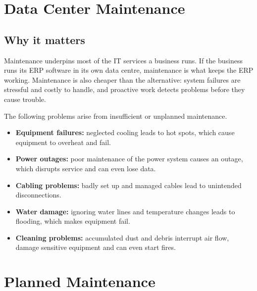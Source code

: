 \documentclass[11pt,a4paper]{article}
\begin{document}
\newpage
\section{Data Center Maintenance}



\subsection{Why it matters}

Maintenance underpins most of the IT services a business runs. If the business runs its ERP
software in its own data centre, maintenance is what keeps the ERP working. Maintenance is
also cheaper than the alternative: system failures are stressful and costly to handle, and
proactive work detects problems before they cause trouble.

The following problems arise from insufficient or unplanned maintenance.

\begin{itemize}\itemsep3pt
  \item \textbf{Equipment failures:} neglected cooling leads to hot spots, which cause
        equipment to overheat and fail.
  \item \textbf{Power outages:} poor maintenance of the power system causes an outage, which
        disrupts service and can even lose data.
  \item \textbf{Cabling problems:} badly set up and managed cables lead to unintended
        disconnections.
  \item \textbf{Water damage:} ignoring water lines and temperature changes leads to flooding,
        which makes equipment fail.
  \item \textbf{Cleaning problems:} accumulated dust and debris interrupt air flow, damage
        sensitive equipment and can even start fires.
\end{itemize}

\newpage
\section{Planned Maintenance}
\end{document}
